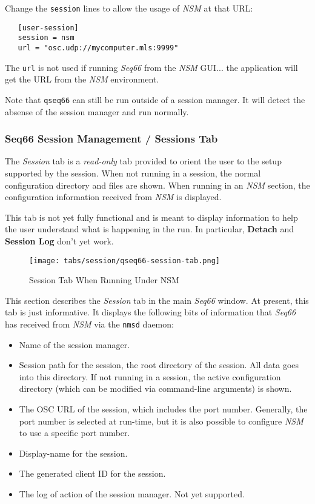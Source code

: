    Change the \texttt{session} lines to allow the usage of
   \textsl{NSM} at that URL:

\begin{verbatim}
   [user-session]
   session = nsm
   url = "osc.udp://mycomputer.mls:9999"
\end{verbatim}

   The \texttt{url} is not used if running \textsl{Seq66} from the \textsl{NSM}
   GUI... the application will get the URL from the \textsl{NSM} environment.

   Note that \texttt{qseq66} can still be run outside of a
   session manager.  It will detect the absense of the session manager and run
   normally.

\subsubsection{Seq66 Session Management / Sessions Tab}
\label{subsubsec:sessions_tab}

   The \textsl{Session} tab is a \textsl{read-only} tab
   provided to orient the user to the setup supported by the session.
   When not running in a session, the normal configuration directory and files
   are shown.  When running in an \textsl{NSM} section, the configuration
   information received from \textsl{NSM} is displayed.

   This tab is not yet fully functional and is meant to display information to
   help the user understand what is happening in the run.  In particular,
   \textbf{Detach} and \textbf{Session Log} don't yet work.

\begin{figure}[H]
   \centering 
   \texttt{[image: tabs/session/qseq66-session-tab.png]}
   \caption*{Session Tab When Running Under NSM}
\end{figure}

   This section describes the \textsl{Session} tab in the main
   \textsl{Seq66} window.  At present, this tab is just informative.  It
   displays the following bits of information that \textsl{Seq66} has received
   from \textsl{NSM} via the \texttt{nmsd} daemon:

   \begin{itemize}
      \item Name of the session manager.
      \item Session path for the session, the root directory of the session.
         All data goes into this directory. If not running in a session,
         the active configuration directory (which can be modified via
         command-line arguments) is shown.
      \item The OSC URL of the session, which includes the port number.
         Generally, the port number is selected at run-time, but it is also
         possible to configure \textsl{NSM} to use a specific port number.
      \item Display-name for the session.
      \item The generated client ID for the session.
      \item The log of action of the session manager. Not yet supported.
   \end{itemize}

